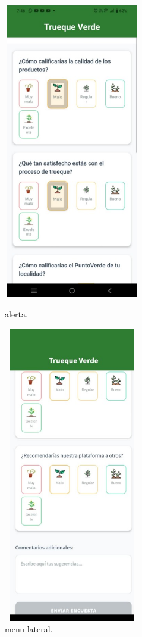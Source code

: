 \documentclass[11pt, a4paper, oneside]{book}
\begin{document}
    \begin{figure}[H]
    \centering
    \begin{minipage}{0.45\textwidth}
        \centering
        \includegraphics[width=6cm,height=13cm]{Pictures/reputacion1.jpg}
        \caption{alerta.}
    \end{minipage}
    \hfill
    \begin{minipage}{0.40\textwidth} 
        \centering
        \includegraphics[width=6cm,height=13cm]{Pictures/reputacion2.jpg}
        \caption{menu lateral.}
    \end{minipage}
\end{figure}
\end{document}
